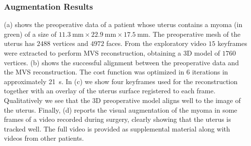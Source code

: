 
\subsubsection{Augmentation Results}
(a) shows the preoperative data of a patient whose uterus contains a myoma (in green) of a size of $\SI{11.3}{\milli\metre}\times\SI{22.9}{\milli\metre}\times\SI{17.5}{\milli\metre}$.
The preoperative mesh of the uterus has $2488$ vertices and $4972$ faces.
From the exploratory video $15$ keyframes were extracted to perform MVS reconstruction, obtaining a 3D model of $1760$ vertices.
(b) shows the successful alignment between the preoperative data and the MVS reconstruction.
The cost function  was optimized in $6$ iterations in approximately \SI{21}{\second}.
In (c) we show four keyframes used for the reconstruction together with an overlay of the uterus surface registered to each frame.
Qualitatively we see that the 3D preoperative model aligns well to the image of the uterus.
Finally, (d) reports the visual augmentation of the myoma in some frames of a video recorded during surgery, clearly showing that the uterus is tracked well. 
The full video is provided as supplemental material along with videos from other patients.


